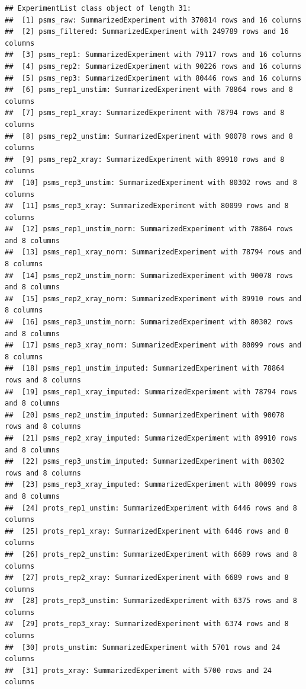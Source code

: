 \documentclass[9pt,a4paper,]{extarticle}
\begin{document}
\begin{verbatim}
## ExperimentList class object of length 31:
##  [1] psms_raw: SummarizedExperiment with 370814 rows and 16 columns
##  [2] psms_filtered: SummarizedExperiment with 249789 rows and 16 columns
##  [3] psms_rep1: SummarizedExperiment with 79117 rows and 16 columns
##  [4] psms_rep2: SummarizedExperiment with 90226 rows and 16 columns
##  [5] psms_rep3: SummarizedExperiment with 80446 rows and 16 columns
##  [6] psms_rep1_unstim: SummarizedExperiment with 78864 rows and 8 columns
##  [7] psms_rep1_xray: SummarizedExperiment with 78794 rows and 8 columns
##  [8] psms_rep2_unstim: SummarizedExperiment with 90078 rows and 8 columns
##  [9] psms_rep2_xray: SummarizedExperiment with 89910 rows and 8 columns
##  [10] psms_rep3_unstim: SummarizedExperiment with 80302 rows and 8 columns
##  [11] psms_rep3_xray: SummarizedExperiment with 80099 rows and 8 columns
##  [12] psms_rep1_unstim_norm: SummarizedExperiment with 78864 rows and 8 columns
##  [13] psms_rep1_xray_norm: SummarizedExperiment with 78794 rows and 8 columns
##  [14] psms_rep2_unstim_norm: SummarizedExperiment with 90078 rows and 8 columns
##  [15] psms_rep2_xray_norm: SummarizedExperiment with 89910 rows and 8 columns
##  [16] psms_rep3_unstim_norm: SummarizedExperiment with 80302 rows and 8 columns
##  [17] psms_rep3_xray_norm: SummarizedExperiment with 80099 rows and 8 columns
##  [18] psms_rep1_unstim_imputed: SummarizedExperiment with 78864 rows and 8 columns
##  [19] psms_rep1_xray_imputed: SummarizedExperiment with 78794 rows and 8 columns
##  [20] psms_rep2_unstim_imputed: SummarizedExperiment with 90078 rows and 8 columns
##  [21] psms_rep2_xray_imputed: SummarizedExperiment with 89910 rows and 8 columns
##  [22] psms_rep3_unstim_imputed: SummarizedExperiment with 80302 rows and 8 columns
##  [23] psms_rep3_xray_imputed: SummarizedExperiment with 80099 rows and 8 columns
##  [24] prots_rep1_unstim: SummarizedExperiment with 6446 rows and 8 columns
##  [25] prots_rep1_xray: SummarizedExperiment with 6446 rows and 8 columns
##  [26] prots_rep2_unstim: SummarizedExperiment with 6689 rows and 8 columns
##  [27] prots_rep2_xray: SummarizedExperiment with 6689 rows and 8 columns
##  [28] prots_rep3_unstim: SummarizedExperiment with 6375 rows and 8 columns
##  [29] prots_rep3_xray: SummarizedExperiment with 6374 rows and 8 columns
##  [30] prots_unstim: SummarizedExperiment with 5701 rows and 24 columns
##  [31] prots_xray: SummarizedExperiment with 5700 rows and 24 columns
\end{verbatim}
\end{document}
